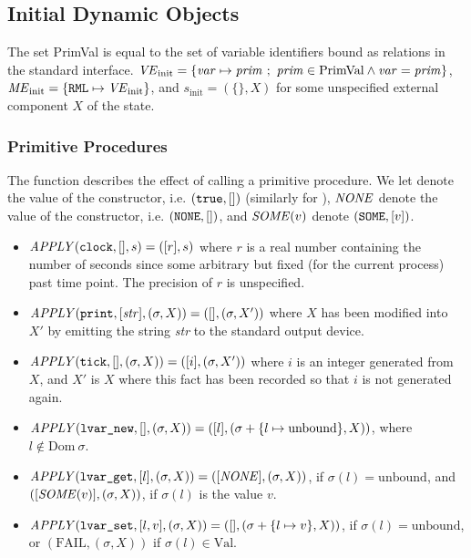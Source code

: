 \subsection{Initial Dynamic Objects}
The set PrimVal is equal to the set of variable identifiers bound as
relations in the standard  interface.
$\mbox{\textit{VE}}_{\mathrm{init}} = \{\mbox{\textit{var}}\mapsto\mbox{\textit{prim}} ~;~ \mbox{\textit{prim}}\in\mathrm{PrimVal} \wedge \mbox{\textit{var}} = \mbox{\textit{prim}}\}$,
$\mbox{\textit{ME}}_{\mathrm{init}} = \{ \mbox{\texttt{RML}} \mapsto \mbox{\textit{VE}}_{\mathrm{init}} \}$, and
$s_{\mathrm{init}} = (\{\},X)$ for some unspecified external component $X$ of the state.
%
\subsubsection{Primitive Procedures}
The function  describes the effect of calling a primitive procedure.
We let  denote the value of the  constructor,
i.e. $(\mbox{\texttt{true}},[])$ (similarly for ),
$\mbox{\textit{NONE}}$ denote the value of the  constructor,
i.e. $(\mbox{\texttt{NONE}},[])$,
and $\mbox{\textit{SOME}}(v)$ denote $(\mbox{\texttt{SOME}},[v])$.
\begin{itemize}
\item $\mbox{\textit{APPLY}}(\mbox{\texttt{clock}},[],s) = ([r],s)$
where $r$ is a real number containing the number of seconds since some
arbitrary but fixed (for the current process) past time point.
The precision of $r$ is unspecified.
\item $\mbox{\textit{APPLY}}(\mbox{\texttt{print}},[\mbox{\textit{str}}],(\sigma,X)) = ([],(\sigma,X'))$
where $X$ has been modified into $X'$ by emitting the string \emph{str}
to the standard output device.
\item $\mbox{\textit{APPLY}}(\mbox{\texttt{tick}},[],(\sigma,X)) = ([i],(\sigma,X'))$ where
$i$ is an integer generated from $X$, and $X'$ is $X$
where this fact has been recorded so that $i$ is not generated again.
\item $\mbox{\textit{APPLY}}(\mbox{\texttt{lvar\_new}},[],(\sigma,X)) = ([l],(\sigma+\{l\mapsto\mathrm{unbound}\},X))$,
where $l\notin\mathrm{Dom}~\sigma$.
\item $\mbox{\textit{APPLY}}(\mbox{\texttt{lvar\_get}},[l],(\sigma,X)) = ([\mbox{\textit{NONE}}],(\sigma,X))$,
if $\sigma(l) = \mathrm{unbound}$, and $([\mbox{\textit{SOME}}(v)],(\sigma,X))$,
if $\sigma(l)$ is the value $v$.
\item $\mbox{\textit{APPLY}}(\mbox{\texttt{lvar\_set}},[l,v],(\sigma,X)) = ([],(\sigma + \{l\mapsto v\},X))$,
if $\sigma(l) = \mathrm{unbound}$, or $(\mathrm{FAIL},(\sigma,X))$
if $\sigma(l) \in \mathrm{Val}$.
\end{itemize}

